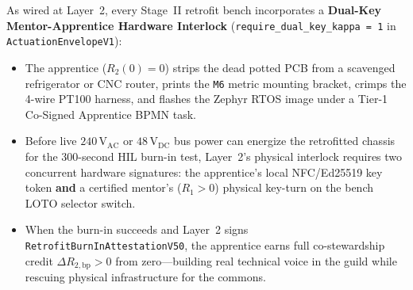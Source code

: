 As wired at Layer~2, every Stage~II retrofit bench incorporates a \textbf{Dual-Key Mentor-Apprentice Hardware Interlock} (\texttt{require\_dual\_key\_kappa = 1} in \texttt{ActuationEnvelopeV1}):
\begin{itemize}
    \item The apprentice ($R_2(0) = 0$) strips the dead potted PCB from a scavenged refrigerator or CNC router, prints the \texttt{M6} metric mounting bracket, crimps the 4-wire PT100 harness, and flashes the Zephyr RTOS image under a Tier-1 Co-Signed Apprentice BPMN task.
    \item Before live $240\,\mathrm{V}_{\mathrm{AC}}$ or $48\,\mathrm{V}_{\mathrm{DC}}$ bus power can energize the retrofitted chassis for the 300-second HIL burn-in test, Layer~2's physical interlock requires two concurrent hardware signatures: the apprentice's local NFC/Ed25519 key token \textbf{and} a certified mentor's ($R_1 > 0$) physical key-turn on the bench LOTO selector switch.
    \item When the burn-in succeeds and Layer~2 signs \texttt{RetrofitBurnInAttestationV50}, the apprentice earns full co-stewardship credit $\Delta R_{2,\mathrm{bp}} > 0$ from zero---building real technical voice in the guild while rescuing physical infrastructure for the commons.
\end{itemize}

